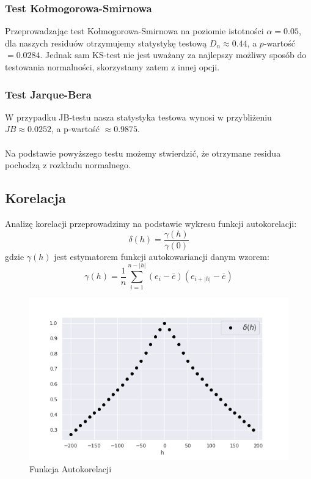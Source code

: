 \documentclass[fleqn]{article}
\begin{document}
    \subsubsection{Test Kołmogorowa-Smirnowa}
    Przeprowadzając test Kołmogorowa-Smirnowa na poziomie istotności $\alpha = 0.05$, dla naszych residuów otrzymujemy statystykę testową $D_n \approx 0.44$, a  $\mathit{p}$-wartość $=0.0284$.
    Jednak sam KS-test nie jest uważany za najlepszy możliwy sposób do testowania normalności, skorzystamy zatem z innej opcji.
    \subsubsection{Test Jarque-Bera}
    W przypadku JB-testu nasza statystyka testowa wynosi w przybliżeniu $JB \approx 0.0252$, a p-wartość $\approx 0.9875$.
    \\
    \\
    \noindent  Na podstawie powyższego testu możemy stwierdzić, że otrzymane residua pochodzą z rozkładu normalnego.
    \subsection{Korelacja}
    Analizę korelacji przeprowadzimy na podstawie wykresu funkcji autokorelacji:  
    $$
        \delta(h) = \frac{\gamma (h)}{\gamma(0)}
    $$
    gdzie $\gamma(h)$ jest estymatorem funkcji autokowariancji danym wzorem:
    $$
        \gamma(h) = \frac{1}{n}\sum_{i=1}^{n-|h|}(e_i- \overline{e} )(e_{i+|h|} - \overline{e}) 
    $$

    \vskip -0.3in

    \begin{figure}[H]
        \includegraphics[width=14cm]{fig6.png}
        \centering
        \caption{Funkcja Autokorelacji}
        \label{fig6}
    \end{figure}
\end{document}

